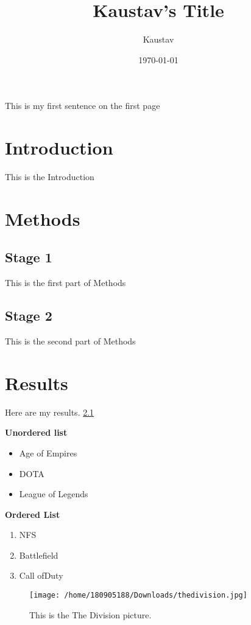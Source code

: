 \documentclass[a4paper,12pt]{article}
\title{Kaustav's Title}
\author{Kaustav}
\date{\today}
\begin{document}
		\maketitle
		\begin{center}			
			This is my first sentence on the first page		
		\end{center}
		\clearpage
		\tableofcontents
		\newpage
		\clearpage
		\section{Introduction}
		This is the Introduction
		\section{Methods}
		\subsection{Stage 1}
		\label{section1}		
		This is the first part of Methods		
		\subsection{Stage 2}
		This is the second part of Methods
		\section{Results}
	
		Here are my results.
		\ref{section1}
		\pageref{section1}
		\clearpage
		
		\textbf{Unordered list}
		\begin{itemize}
			\item Age of Empires
			\item DOTA
			\item League of Legends
		\end{itemize}
	
		\textbf{Ordered List}
		\begin{enumerate}
			\item NFS
			\item Battlefield
			\item Call ofDuty
		\end{enumerate}
	
	\begin{figure}[h]
		\centering
		\texttt{[image: /home/180905188/Downloads/thedivision.jpg]}
		\caption{This is the The Division picture.}
		\label{Cross-reference_key}
		
	\end{figure}
\end{document}
